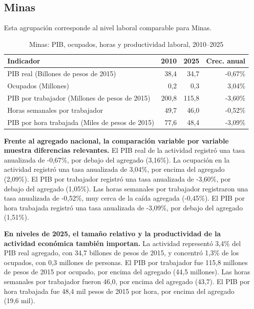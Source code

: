 \subsection{Minas}

Esta agrupación corresponde al nivel laboral comparable para Minas.

\begin{table}[H]
\centering
\caption{Minas: PIB, ocupados, horas y productividad laboral, 2010--2025}
\label{tab:agg25_b_productividad}
\small
\begin{tabular}{lrrr}
\toprule
Indicador & 2010 & 2025 & Crec. anual \\
\midrule
PIB real  (Billones de pesos de 2015) & 38,4 & 34,7 & -0,67\% \\
Ocupados (Millones) & 0,2 & 0,3 & 3,04\% \\
PIB por trabajador (Millones de pesos de 2015) & 200,8 & 115,8 & -3,60\% \\
Horas semanales por trabajador & 49,7 & 46,0 & -0,52\% \\
PIB por hora trabajada (Miles de pesos de 2015) & 77,6 & 48,4 & -3,09\% \\
\bottomrule
\end{tabular}
\end{table}

\textbf{Frente al agregado nacional, la comparación variable por variable muestra diferencias relevantes.} El PIB real de la actividad registró una tasa anualizada de -0,67\%, por debajo del agregado (3,16\%). La ocupación en la actividad registró una tasa anualizada de 3,04\%, por encima del agregado (2,09\%). El PIB por trabajador registró una tasa anualizada de -3,60\%, por debajo del agregado (1,05\%). Las horas semanales por trabajador registraron una tasa anualizada de -0,52\%, muy cerca de la caída agregada (-0,45\%). El PIB por hora trabajada registró una tasa anualizada de -3,09\%, por debajo del agregado (1,51\%).

\textbf{En niveles de 2025, el tamaño relativo y la productividad de la actividad económica también importan.} La actividad representó 3,4\% del PIB real agregado, con 34,7 billones de pesos de 2015, y concentró 1,3\% de los ocupados, con 0,3 millones de personas. El PIB por trabajador fue 115,8 millones de pesos de 2015 por ocupado, por encima del agregado (44,5 millones). Las horas semanales por trabajador fueron 46,0, por encima del agregado (43,7). El PIB por hora trabajada fue 48,4 mil pesos de 2015 por hora, por encima del agregado (19,6 mil).

